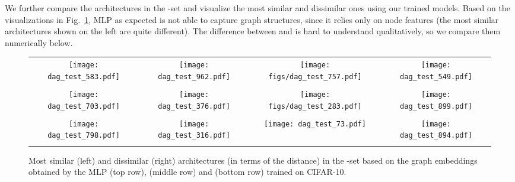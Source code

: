 We further compare the architectures in the \iid-\iidtest set and visualize the most similar and dissimilar ones using our trained models. Based on the visualizations in Fig.~\ref{fig:compare}, MLP as expected is not able to capture graph structures, since it relies only on node features (the most similar architectures shown on the left are quite different). The difference between \ghnbase and \ghnours is hard to understand qualitatively, so we compare them numerically below.


\begin{figure}[htpb]
	\centering
	\scriptsize
	\vspace{0pt}
	\setlength{\tabcolsep}{1pt}
	\begin{tabular}{cc|cc}
		{\texttt{[image: dag\_test\_583.pdf]}} & {\texttt{[image: dag\_test\_962.pdf]}} & 
		{\texttt{[image: figs/dag\_test\_757.pdf]}} & {\texttt{[image: dag\_test\_549.pdf]}} \\
		\multicolumn{2}{c}{} & \multicolumn{2}{c}{} \Bstrut \\
		
		{\texttt{[image: dag\_test\_703.pdf]}} & {\texttt{[image: dag\_test\_376.pdf]}} & 
		{\texttt{[image: figs/dag\_test\_283.pdf]}} & {\texttt{[image: dag\_test\_899.pdf]}} \\
		\multicolumn{2}{c}{} & \multicolumn{2}{c}{} \Bstrut \\
		
		{\texttt{[image: dag\_test\_798.pdf]}} & {\texttt{[image: dag\_test\_316.pdf]}} & 
		{\texttt{[image: dag\_test\_73.pdf]}} & {\texttt{[image: dag\_test\_894.pdf]}} \\
		\multicolumn{2}{c}{} & \multicolumn{2}{c}{}
	\end{tabular}
	\caption{Most similar (left) and dissimilar (right) architectures (in terms of the  distance) in the \iid-\iidtest set based on the graph embeddings obtained by the MLP (top row), \ghnbase (middle row) and \ghnours (bottom row) trained on CIFAR-10.}
	\label{fig:compare}
	\vspace{0pt}
\end{figure}


